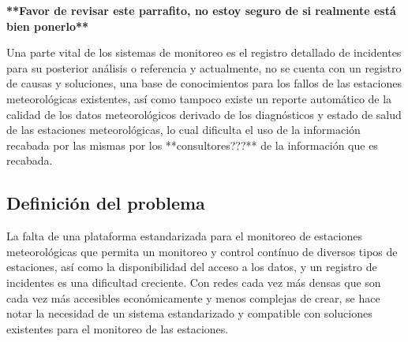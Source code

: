 \textbf{**Favor de revisar este parrafito, no estoy seguro de si realmente está bien ponerlo**}

Una parte vital de los sistemas de monitoreo es el registro detallado de incidentes para su posterior análisis o referencia y actualmente, no se cuenta con un registro de causas y soluciones, una base de conocimientos para los fallos de las estaciones meteorológicas existentes, así como tampoco existe un reporte automático de la calidad de los datos meteorológicos derivado de los diagnósticos y estado de salud de las estaciones meteorológicas, lo cual dificulta el uso de la información recabada por las mismas por los **consultores???** de la información que es recabada.


\subsection{Definición del problema}

La falta de una plataforma estandarizada para el monitoreo de estaciones meteorológicas que permita un monitoreo y control contínuo de diversos tipos de estaciones, así como la disponibilidad del acceso a los datos, y un registro de incidentes es una dificultad creciente. Con redes cada vez más densas que son cada vez más accesibles económicamente y menos complejas de crear, se hace notar la necesidad de un sistema estandarizado y compatible con soluciones existentes para el monitoreo de las estaciones.


